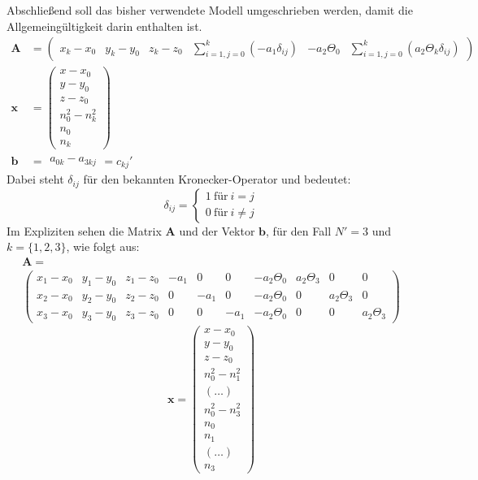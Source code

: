 {
Abschließend soll das bisher verwendete Modell umgeschrieben werden, damit die Allgemeingültigkeit darin enthalten ist.%
\begin{align}
%
%
\mathbf{A}&=
\left(
	\begin{array}{cccccc}
		x_k-x_0 & y_k-y_0 & z_k-z_0 & \sum_{i=1,j=0}^{k}(-a_1\delta_{ij}) &  -a_2\Theta_0 & \sum_{i=1,j=0}^{k}(a_2\Theta_k\delta_{ij})
	\end{array}
\right)\nonumber\\
%
\mathbf{x}&=
\left(
   \begin{array}{c}
	   x-x_0\\
	   y-y_0\\
	   z-z_0\\
	   n_0^2-n_k^2\\
	   n_0\\
	   n_k
   \end{array}
\right)\nonumber\\
%
\mathbf{b}&=
	\begin{array}{c}
		a_{0k}-a_{3kj} 
	\end{array}
	= c_{kj}'\nonumber
\end{align}
%
Dabei steht $\delta_{ij}$ für den bekannten Kronecker-Operator und bedeutet:
\begin{equation*}
\delta_{ij} = \begin{cases}1 ~\text{für}~ i=j\\ 0 ~\text{für}~ i\neq j\end{cases}
\end{equation*}
%
Im Expliziten sehen die Matrix $\mathbf{A}$ und der Vektor $\mathbf{b}$, für den Fall $N'=3$ und $k=\{1,2,3\}$, wie folgt aus:
%
\begin{multline}
\mathbf{A}=\\
\left(
	\begin{array}{cccccccccc}
		x_1-x_0 & y_1-y_0 & z_1-z_0 & -a_1 & 0 & 0 & -a_2\Theta_0 & a_2\Theta_3 & 0 & 0 \\
		x_2-x_0 & y_2-y_0 & z_2-z_0 & 0 & -a_1 & 0 & -a_2\Theta_0& 0 & a_2\Theta_3 & 0 \\
		x_3-x_0 & y_3-y_0 & z_3-z_0 & 0 & 0 & -a_1 & -a_2\Theta_0& 0 & 0 & a_2\Theta_3
	\end{array}
\right) \nonumber
\end{multline}
%
\begin{equation}
\mathbf{x}=
\left(
	\begin{array}{c}
		x-x_0	\\
		y-y_0	\\
		z-z_0	\\
		n_0^2-n_1^2	\\
		(\dots)	\\
		n_0^2-n_3^2	\\
		n_0 \\
		n_1	\\
		(\dots)	\\
		n_3	
	\end{array}
\right)\nonumber
\end{equation}
%
}

